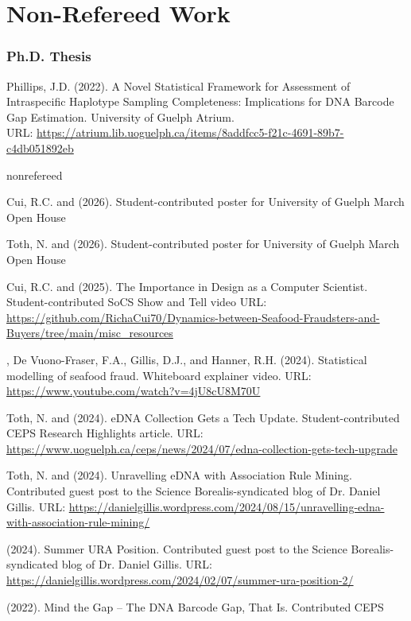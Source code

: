 \section{Non-Refereed Work}
\subsubsection{Ph.D. Thesis}
Phillips, J.D. (2022). A Novel Statistical Framework for Assessment of
Intraspecific Haplotype Sampling Completeness: Implications for DNA Barcode Gap
Estimation. University of Guelph Atrium.\\
URL: \url{https://atrium.lib.uoguelph.ca/items/8addfcc5-f21c-4691-89b7-c4db051892eb}

\bigskip
\legenddirect

\medskip
\begin{revlist}[itemsep=0.45\baselineskip]{nonrefereed}
\item \dsup Cui, R.C. and \me (2026). Student-contributed poster for University of
  Guelph March Open House
\item \dsup Toth, N. and \me (2026). Student-contributed poster for University of
  Guelph March Open House
\item \dsup Cui, R.C. and \me (2025). The Importance in Design as a Computer
  Scientist. Student-contributed SoCS Show and Tell video URL:
  \url{https://github.com/RichaCui70/Dynamics-between-Seafood-Fraudsters-and-Buyers/tree/main/misc_resources}
\item \me, \dsup De Vuono-Fraser, F.A., Gillis, D.J., and Hanner, R.H. (2024).
  Statistical modelling of seafood fraud. Whiteboard explainer video. URL:
  \url{https://www.youtube.com/watch?v=4jU8cU8M70U}
\item \dsup Toth, N. and \me (2024). eDNA Collection Gets a Tech Update.
  Student-contributed CEPS Research Highlights article. URL:
  \url{https://www.uoguelph.ca/ceps/news/2024/07/edna-collection-gets-tech-upgrade}
\item \dsup Toth, N. and \me (2024). Unravelling eDNA with Association Rule
  Mining. Contributed guest post to the Science Borealis-syndicated blog of
  Dr. Daniel Gillis. URL:
  \url{https://danielgillis.wordpress.com/2024/08/15/unravelling-edna-with-association-rule-mining/}
\item \me (2024). Summer URA Position. Contributed guest post to the Science
  Borealis-syndicated blog of Dr. Daniel Gillis. URL:
  \url{https://danielgillis.wordpress.com/2024/02/07/summer-ura-position-2/}
\item \me (2022). Mind the Gap -- The DNA Barcode Gap, That Is. Contributed CEPS

\end{revlist}
